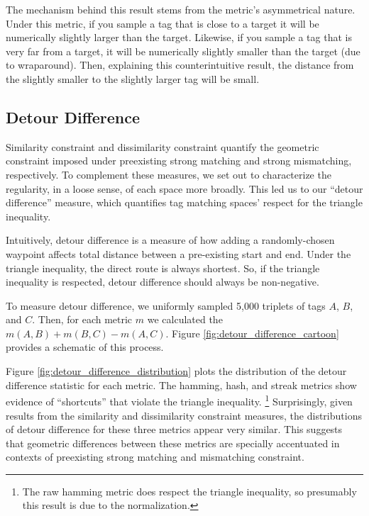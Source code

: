 The mechanism behind this result stems from the metric's asymmetrical nature.
Under this metric, if you sample a tag that is close to a target it will be numerically slightly larger than the target.
Likewise, if you sample a tag that is very far from a target, it will be numerically slightly smaller than the target (due to wraparound).
Then, explaining this counterintuitive result, the distance from the slightly smaller to the slightly larger tag will be small.

\subsection{Detour Difference} \label{sec:detour_difference}



Similarity constraint and dissimilarity constraint quantify the geometric constraint imposed under preexisting strong matching and strong mismatching, respectively.
To complement these measures, we set out to characterize the regularity, in a loose sense, of each space more broadly.
This led us to our ``detour difference'' measure, which quantifies tag matching spaces' respect for the triangle inequality.

Intuitively, detour difference is a measure of how adding a randomly-chosen waypoint affects total distance between a pre-existing start and end.
Under the triangle inequality, the direct route is always shortest.
So, if the triangle inequality is respected, detour difference should always be non-negative.

To measure detour difference, we uniformly sampled 5,000 triplets of tags $A$, $B$, and $C$.
Then, for each metric $m$ we calculated the $m(A, B) + m(B, C) - m(A, C)$.
Figure \ref{fig:detour_difference_cartoon} provides a schematic of this process.

Figure \ref{fig:detour_difference_distribution} plots the distribution of the detour difference statistic for each metric.
The hamming, hash, and streak metrics show evidence of ``shortcuts'' that violate the triangle inequality.
\footnote{
The raw hamming metric does respect the triangle inequality, so presumably this result is due to the normalization.
}
Surprisingly, given results from the similarity and dissimilarity constraint measures, the distributions of detour difference for these three metrics appear very similar.
This suggests that geometric differences between these metrics are specially accentuated in contexts of preexisting strong matching and mismatching constraint.
